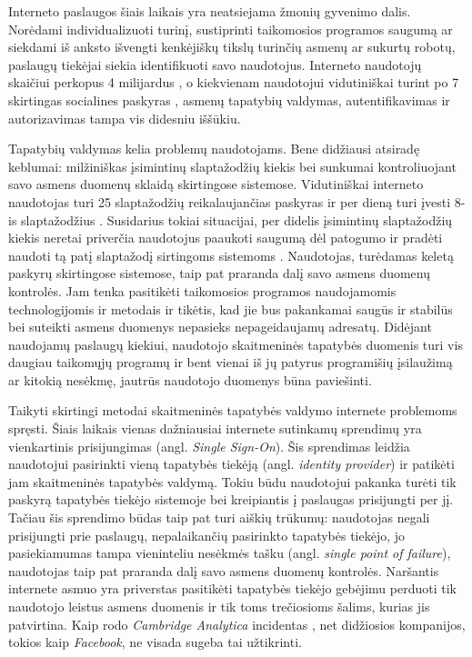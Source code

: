 Interneto paslaugos šiais laikais yra neatsiejama žmonių gyvenimo dalis.
Norėdami individualizuoti turinį, sustiprinti taikomosios programos saugumą ar siekdami
iš anksto išvengti kenkėjiškų tikslų turinčių asmenų ar sukurtų robotų, paslaugų tiekėjai
siekia identifikuoti savo naudotojus. Interneto naudotojų skaičiui perkopus 4 milijardus \cite{InternetUsers2018},
o kiekvienam naudotojui vidutiniškai turint po 7 skirtingas socialines paskyras \cite{Mander2017}, asmenų
tapatybių valdymas, autentifikavimas ir autorizavimas tampa vis didesniu iššūkiu.

Tapatybių valdymas kelia problemų naudotojams. Bene didžiausi atsiradę keblumai:
milžiniškas įsimintinų slaptažodžių kiekis bei sunkumai kontroliuojant savo asmens duomenų sklaidą
skirtingose sistemose. Vidutiniškai interneto naudotojas turi 25 slaptažodžių reikalaujančias paskyras
ir per dieną turi įvesti 8-is slaptažodžius \cite{Florencio2007}. Susidarius tokiai situacijai, per didelis įsimintinų slaptažodžių kiekis neretai 
priverčia naudotojus paaukoti saugumą dėl patogumo
ir pradėti naudoti tą patį slaptažodį sirtingoms sistemoms \cite{Pashalidis2003, Samar1999}. Naudotojas, turėdamas keletą
paskyrų skirtingose sistemose, taip pat praranda dalį savo asmens duomenų kontrolės. Jam tenka pasitikėti
taikomosios programos naudojamomis technologijomis ir metodais ir tikėtis, kad jie bus pakankamai saugūs
ir stabilūs bei suteikti asmens duomenys nepasieks nepageidaujamų adresatų. Didėjant naudojamų paslaugų kiekiui,
naudotojo skaitmeninės tapatybės duomenis turi vis daugiau taikomųjų programų ir bent vienai iš jų
patyrus programišių įsilaužimą ar kitokią nesėkmę, jautrūs naudotojo duomenys būna paviešinti. 

Taikyti skirtingi metodai skaitmeninės tapatybės valdymo internete problemoms spręsti. 
Šiais laikais vienas dažniausiai internete sutinkamų sprendimų yra vienkartinis prisijungimas (angl. \textit{Single Sign-On}).
Šis sprendimas leidžia naudotojui pasirinkti
vieną tapatybės tiekėją (angl. \textit{identity provider}) ir patikėti jam skaitmeninės tapatybės valdymą. Tokiu
būdu naudotojui pakanka turėti tik paskyrą tapatybės tiekėjo sistemoje bei kreipiantis į paslaugas prisijungti per jį.
Tačiau šis sprendimo būdas taip pat turi aiškių trūkumų: naudotojas negali prisijungti
prie paslaugų, nepalaikančių pasirinkto tapatybės tiekėjo, jo pasiekiamumas
tampa vieninteliu nesėkmės tašku (angl. \textit{single point of failure}), naudotojas taip pat praranda dalį savo asmens duomenų kontrolės.
Naršantis internete asmuo yra priverstas pasitikėti tapatybės tiekėjo
gebėjimu perduoti tik naudotojo leistus asmens duomenis ir tik toms trečiosioms šalims, kurias jis patvirtina.
Kaip rodo \textit{Cambridge Analytica} incidentas \cite{CambridgeAnalytica}, net didžiosios kompanijos, tokios
kaip \textit{Facebook}, ne visada sugeba tai užtikrinti.

